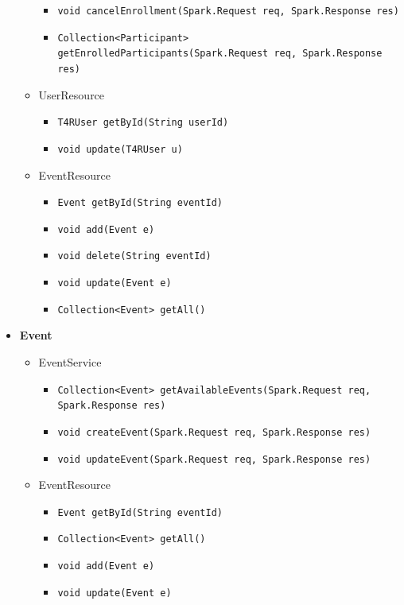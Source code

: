 \documentclass[a4paper, hidelinks, 12pt]{report}
\begin{document}
\begin{itemize}
\begin{itemize}
\begin{itemize}
						\item{\verb|void cancelEnrollment(Spark.Request req, Spark.Response res)|}
						\item{\verb|Collection<Participant> getEnrolledParticipants(Spark.Request req, Spark.Response res)|}
					\end{itemize}
				\item{UserResource}
					\begin{itemize}
						\item{\verb|T4RUser getById(String userId)|}
						\item{\verb|void update(T4RUser u)|}
					\end{itemize}
				\item{EventResource}
					\begin{itemize}
						\item{\verb|Event getById(String eventId)|}
						\item{\verb|void add(Event e)|}
						\item{\verb|void delete(String eventId)|}
						\item{\verb|void update(Event e)|}
						\item{\verb|Collection<Event> getAll()|}
					\end{itemize}
			\end{itemize}
		\item{\textbf{Event}}
			\begin{itemize}
				\item{EventService}
					\begin{itemize}
						\item{\verb|Collection<Event> getAvailableEvents(Spark.Request req, Spark.Response res)|}
						\item{\verb|void createEvent(Spark.Request req, Spark.Response res)|}
						\item{\verb|void updateEvent(Spark.Request req, Spark.Response res)|}
					\end{itemize}
				\item{EventResource}
					\begin{itemize}
						\item{\verb|Event getById(String eventId)|}
						\item{\verb|Collection<Event> getAll()|}
						\item{\verb|void add(Event e)|}
						\item{\verb|void update(Event e)|}
					\end{itemize}
			\end{itemize}

\end{itemize}
\end{document}
